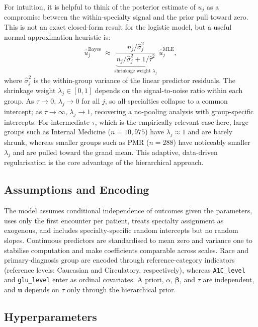\documentclass[10pt]{article}
\newcommand{\bbeta}{\bm{\beta}}
\newcommand{\bu}{\bm{u}}
\begin{document}
For intuition, it is helpful to think of the posterior estimate of $u_j$ as a
compromise between the within-specialty signal and the prior pull toward zero.
This is not an exact closed-form result for the logistic model, but a useful
normal-approximation heuristic is:
\begin{equation}\label{eq:shrinkage}
  \hat{u}_j^{\text{Bayes}} \;\approx\;
  \underbrace{\frac{n_j / \hat{\sigma}_j^2}{n_j / \hat{\sigma}_j^2 + 1/\hat{\tau}^2}}_{\text{shrinkage weight } \lambda_j}
  \;\hat{u}_j^{\text{MLE}},
\end{equation}
where $\hat{\sigma}_j^2$ is the within-group variance of the linear predictor
residuals.  The shrinkage weight $\lambda_j \in [0,1]$ depends on the
signal-to-noise ratio within each group. As $\tau \to 0$, $\lambda_j \to 0$
for all $j$, so all specialties collapse to a common intercept; as
$\tau \to \infty$, $\lambda_j \to 1$, recovering a no-pooling analysis with
group-specific intercepts. For intermediate $\tau$, which is the empirically
relevant case here, large groups such as Internal Medicine ($n = 10{,}975$)
have $\lambda_j \approx 1$ and are barely shrunk, whereas smaller groups such
as PMR ($n = 288$) have noticeably smaller $\lambda_j$ and are pulled toward
the grand mean. This adaptive, data-driven regularisation is the core
advantage of the hierarchical approach.

\subsection{Assumptions and Encoding}

The model assumes conditional independence of outcomes given the parameters,
uses only the first encounter per patient, treats specialty assignment as
exogenous, and includes specialty-specific random intercepts but no random
slopes. Continuous predictors are standardised to mean zero and variance one to
stabilise computation and make coefficients comparable across scales. Race and
primary-diagnosis group are encoded through reference-category indicators
(reference levels: Caucasian and Circulatory, respectively), whereas
\texttt{A1C\_level} and \texttt{glu\_level} enter as ordinal covariates. A
priori, $\alpha$, $\bbeta$, and $\tau$ are independent, and $\bu$ depends on
$\tau$ only through the hierarchical prior.

\subsection{Hyperparameters}
\end{document}
